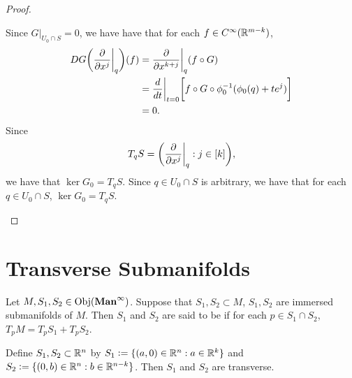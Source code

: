\documentclass{book}
\begin{document}
\begin{proof}
\begin{itemize}
\begin{itemize}
			\end{itemize}
			Since $G|_{U_0 \cap S} = 0$, we have have that for each $f \in C^{\infty}(\mathbb{R}^{m-k})$,
			\begin{align*}
				DG \bigg( \frac{\partial}{\partial x^j} \bigg|_q \bigg)(f)
				& = \frac{\partial}{\partial x^{k+j}} \bigg|_q (f \circ G) \\
				& = \frac{d}{d t} \bigg|_{t = 0} \bigg[f \circ G \circ \phi_0^{-1}(\phi_0(q) + t e^j) \bigg] \\
				& = 0.
			\end{align*}
			Since 
			$$T_q S = \bigg(\frac{\partial}{\partial x^j} \bigg|_q : j \in [k] \bigg),$$
			we have that $\ker G_0 = T_q S$. Since $q \in U_0 \cap S$ is arbitrary, we have that for each $q \in U_0 \cap S$, $\ker G_0 = T_qS$.
		\end{itemize}
	\end{proof}









































	\newpage

	\section{Transverse Submanifolds}

	\begin{defn} 
		Let $M, S_1, S_2 \in \operatorname{Obj}(\operatorname*{\text{\textbf{Man}}^{\infty}})$. Suppose that $S_1, S_2 \subset M$, $S_1, S_2$ are immersed submanifolds of $M$. Then $S_1$ and $S_2$ are said to be  if for each $p \in S_1 \cap S_2$, $T_pM = T_p S_1 + T_p S_2$. 
	\end{defn}

	\begin{ex} 
		Define $S_1, S_2 \subset \mathbb{R}^n$ by $S_1 \vcentcolon= \{(a,0) \in \mathbb{R}^n: a \in \mathbb{R}^k\}$ and $S_2 \vcentcolon= \{(0,b) \in \mathbb{R}^n: b \in \mathbb{R}^{n-k}\}$. Then $S_1$ and $S_2$ are transverse.
	\end{ex}
	
\end{document}
